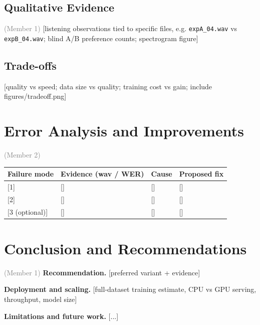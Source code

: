 \documentclass[11pt,a4paper]{article}
\newcommand{\ph}[1]{\colorbox{red!12}{\textcolor{red!70!black}{\small\textsf{[#1]}}}}
\newcommand{\owner}[1]{\hfill{\small\textcolor{gray}{(#1)}}}
\begin{document}
\subsection{Qualitative Evidence}\owner{Member 1}
\ph{listening observations tied to specific files, e.g. \texttt{expA\_04.wav} vs \texttt{expB\_04.wav}; blind A/B preference counts; spectrogram figure}

\subsection{Trade-offs}
\ph{quality vs speed; data size vs quality; training cost vs gain; include figures/tradeoff.png}

\section{Error Analysis and Improvements}\owner{Member 2}
\begin{tabularx}{\linewidth}{@{}lXXX@{}}
\toprule
Failure mode & Evidence (wav / WER) & Cause & Proposed fix \\ \midrule
\ph{1} & \ph{} & \ph{} & \ph{} \\
\ph{2} & \ph{} & \ph{} & \ph{} \\
\ph{3 (optional)} & \ph{} & \ph{} & \ph{} \\ \bottomrule
\end{tabularx}

\section{Conclusion and Recommendations}\owner{Member 1}
\noindent\textbf{Recommendation.} \ph{preferred variant + evidence}

\noindent\textbf{Deployment and scaling.} \ph{full-dataset training estimate, CPU vs GPU serving, throughput, model size}

\noindent\textbf{Limitations and future work.} \ph{...}


\end{document}
